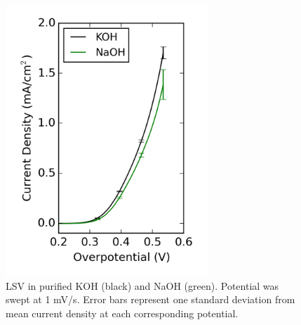 \documentclass[journal=jpccck,manuscript=suppinfo,email=true]{achemso}
\begin{document}
\begin{figure}[h]
\centering
\includegraphics[width=3in]{./images/figures-supp-info/IvsV-Na-K-pure-01-16-15.png}
\caption{\label{fig-s2}LSV in purified KOH (black) and NaOH (green). Potential was swept at 1 mV/s. Error bars represent one standard deviation from mean current density at each corresponding potential.}
\end{figure}
\end{document}
